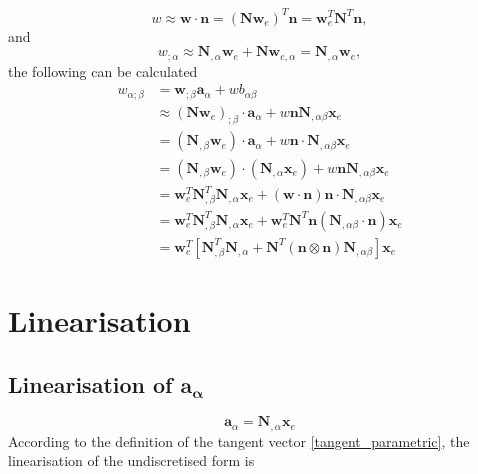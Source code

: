     \begin{equation}\label{eq:w_n}
        w \approx \boldsymbol{w} \cdot \boldsymbol{n} = \left( \mathbf{N} \mathbf{w}_{e} \right)^{T} \boldsymbol{n} = \mathbf{w}_{e}^{T} \mathbf{N}^{T} \boldsymbol{n},
    \end{equation}
and
    \begin{equation}\label{eq:w_cov}
    w_{; \alpha} \approx \mathbf{N}_{, \alpha} \mathbf{w}_{e} + \mathbf{N} \mathbf{w}_{e , \alpha} = \mathbf{N}_{, \alpha} \mathbf{w}_{e},
    \end{equation}
the following can be calculated
    \begin{equation}\label{eq:w_alp_cov}
        \begin{split}
            w_{\alpha; \beta} &= \boldsymbol{w}_{; \beta} \boldsymbol{a}_{\alpha} + w b_{\alpha \beta} \\ &\approx \left( \mathbf{N} \mathbf{w}_{e} \right)_{; \beta} \cdot \boldsymbol{a}_{\alpha} + w \boldsymbol{n} \mathbf{N}_{, \alpha \beta} \mathbf{x}_{e} \\ &= \left( \mathbf{N}_{, \beta} \mathbf{w}_{e} \right) \cdot \boldsymbol{a}_{\alpha} + w \boldsymbol{n} \cdot \mathbf{N}_{, \alpha \beta} \mathbf{x}_{e} \\ &= \left( \mathbf{N}_{, \beta} \mathbf{w}_{e} \right) \cdot \left( \mathbf{N}_{, \alpha} \mathbf{x}_{e} \right) + w \boldsymbol{n} \mathbf{N}_{, \alpha \beta} \mathbf{x}_{e} \\ &= \mathbf{w}_{e}^{T} \mathbf{N}_{, \beta}^{T} \mathbf{N}_{, \alpha} \mathbf{x}_{e} + \left( \boldsymbol{w} \cdot \boldsymbol{n} \right) \boldsymbol{n} \cdot \mathbf{N}_{, \alpha \beta} \mathbf{x}_{e} \\ &= \mathbf{w}_{e}^{T} \mathbf{N}_{, \beta}^{T} \mathbf{N}_{, \alpha} \mathbf{x}_{e} + \mathbf{w}_{e}^{T} \mathbf{N}^{T} \boldsymbol{n} \left( \mathbf{N}_{, \alpha \beta} \cdot \boldsymbol{n} \right) \mathbf{x}_{e} \\ &= \mathbf{w}_{e}^{T} \left[ \mathbf{N}_{, \beta}^{T} \mathbf{N}_{, \alpha} + \mathbf{N}^{T} \left( \boldsymbol{n} \otimes \boldsymbol{n} \right) \mathbf{N}_{, \alpha \beta} \right] \mathbf{x}_{e}
        \end{split}
    \end{equation}

\section{Linearisation} \label{appendices:curvy_linearisations}
\subsection{Linearisation of \texorpdfstring{$\boldsymbol{a_{\alpha}}$}{a-a}}
\begin{equation}\label{eq:a_a_lin}
    \boldsymbol{a}_{\alpha} = \mathbf{N}_{,\alpha} \mathbf{x}_{e}
\end{equation}
According to the definition of the tangent vector \eqref{tangent_parametric}, the linearisation of the undiscretised
 form is
    
